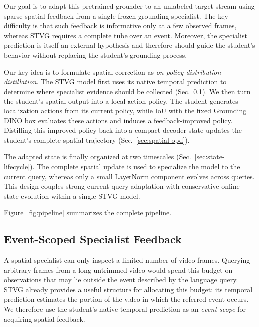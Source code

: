 \documentclass[10pt,twocolumn,letterpaper]{article}
\begin{document}
Our goal is to adapt this pretrained grounder to an unlabeled target stream
using sparse spatial feedback from a single frozen grounding specialist.
The key difficulty is that such feedback is informative only at a few observed
frames, whereas STVG requires a complete tube over an event. Moreover, the
specialist prediction is itself an external hypothesis and therefore should
guide the student's behavior without replacing the student's grounding
process.

Our key idea is to formulate spatial correction as \emph{on-policy
	distribution distillation}. The STVG model first uses its native temporal
prediction to determine where specialist evidence should be collected
(Sec.~\ref{sec:temporal-scope}). We then turn the student's spatial output into
a local action policy. The student generates localization actions from its
current policy, while IoU with the fixed Grounding DINO box evaluates
these actions and induces a feedback-improved policy. Distilling this improved policy back into a compact
decoder state updates the student's complete spatial trajectory
(Sec.~\ref{sec:spatial-opd}).

The adapted state is finally organized at two timescales
(Sec.~\ref{sec:state-lifecycle}). The complete spatial update is used to
specialize the model to the current query, whereas only a small LayerNorm
component evolves across queries. This design couples strong current-query
adaptation with conservative online state evolution within a single STVG
model.

Figure~\ref{fig:pipeline} summarizes the complete pipeline.


\subsection{Event-Scoped Specialist Feedback}
\label{sec:temporal-scope}

A spatial specialist can only inspect a limited number of video frames.
Querying arbitrary frames from a long untrimmed video would spend this budget
on observations that may lie outside the event described by the language
query. STVG already provides a useful structure for allocating this budget:
its temporal prediction estimates the portion of the video in which the
referred event occurs. We therefore use the student's native temporal
prediction as an \emph{event scope} for acquiring spatial feedback.
\end{document}
